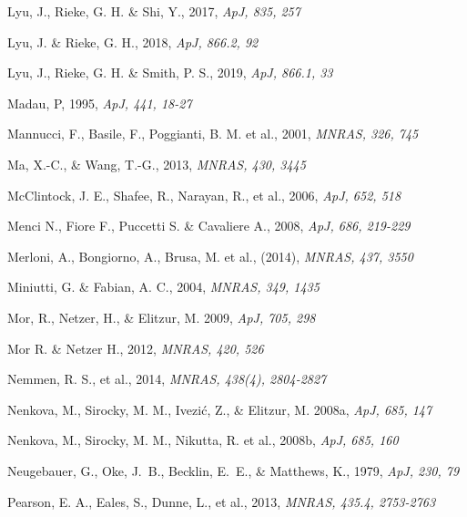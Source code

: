 \documentclass[]{aa}
\begin{document}
\begin{thebibliography}{}
Lyu, J., Rieke, G. H. \& Shi, Y., 2017,
\newblock \emph{ApJ, 835, 257}

Lyu, J. \& Rieke, G. H., 2018,
\newblock \emph{ApJ, 866.2, 92}

Lyu, J., Rieke, G. H. \& Smith, P. S., 2019,
\newblock \emph{ApJ, 866.1, 33}

Madau, P, 1995,
\newblock \emph{ApJ, 441, 18-27}

Mannucci, F., Basile, F., Poggianti, B. M. et al., 2001,
\newblock \emph{MNRAS, 326, 745}

Ma, X.-C., \& Wang, T.-G., 2013, 
\newblock \emph{MNRAS, 430, 3445}

McClintock, J. E., Shafee, R., Narayan, R., et al., 2006,
\newblock \emph{ApJ, 652, 518}

Menci N., Fiore F., Puccetti S. \& Cavaliere A., 2008,
\newblock \emph{ApJ, 686, 219-229}

Merloni, A., Bongiorno, A., Brusa, M. et al., (2014),
\newblock \emph{MNRAS, 437, 3550}

Miniutti, G. \& Fabian, A. C., 2004,
\newblock \emph{MNRAS, 349, 1435}

Mor, R., Netzer, H., \& Elitzur, M. 2009,
\newblock \emph{ApJ, 705, 298}

Mor R. \& Netzer H., 2012,
\newblock \emph{MNRAS, 420, 526}

Nemmen, R. S., et al., 2014,
\newblock \emph{MNRAS, 438(4), 2804-2827}

Nenkova, M., Sirocky, M. M., Ivezić, Z., \& Elitzur, M. 2008a,
\newblock \emph{ApJ, 685, 147}

Nenkova, M., Sirocky, M. M., Nikutta, R. et al., 2008b,
\newblock \emph{ApJ, 685, 160}

Neugebauer, G., Oke, J.~B., Becklin, E.~E., \& Matthews, K., 1979,
\newblock \emph{ApJ, 230, 79}

Pearson, E. A., Eales, S., Dunne, L., et al., 2013,
\newblock \emph{MNRAS, 435.4, 2753-2763}


\end{thebibliography}
\end{document}
